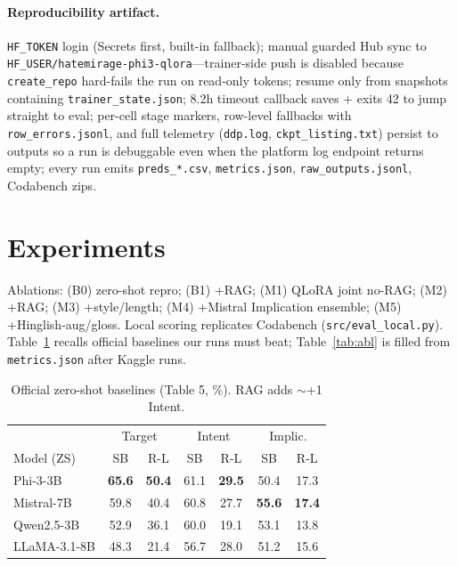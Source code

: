 \documentclass[11pt]{article}
\begin{document}
\paragraph{Reproducibility artifact.}
\texttt{HF\_TOKEN} login (Secrets first, built-in fallback); manual guarded Hub sync to \texttt{HF\_USER/hatemirage-phi3-qlora}---trainer-side push is disabled because \texttt{create\_repo} hard-fails the run on read-only tokens; resume only from snapshots containing \texttt{trainer\_state.json}; 8.2h timeout callback saves + exits 42 to jump straight to eval; per-cell stage markers, row-level fallbacks with \texttt{row\_errors.jsonl}, and full telemetry (\texttt{ddp.log}, \texttt{ckpt\_listing.txt}) persist to outputs so a run is debuggable even when the platform log endpoint returns empty; every run emits \texttt{preds\_*.csv}, \texttt{metrics.json}, \texttt{raw\_outputs.jsonl}, Codabench zips.

\section{Experiments}
Ablations: (B0) zero-shot repro; (B1) +RAG; (M1) QLoRA joint no-RAG; (M2) +RAG; (M3) +style/length; (M4) +Mistral Implication ensemble; (M5) +Hinglish-aug/gloss.
Local scoring replicates Codabench (\texttt{src/eval\_local.py}).
Table~\ref{tab:base} recalls official baselines our runs must beat; Table~\ref{tab:abl} is filled from \texttt{metrics.json} after Kaggle runs.

\begin{table}[t]
\centering
\small
\begin{tabular}{lcccccc}
\toprule
 & \multicolumn{2}{c}{Target} & \multicolumn{2}{c}{Intent} & \multicolumn{2}{c}{Implic.} \\
Model (ZS) & SB & R-L & SB & R-L & SB & R-L \\
\midrule
Phi-3-3B & \textbf{65.6} & \textbf{50.4} & 61.1 & \textbf{29.5} & 50.4 & 17.3 \\
Mistral-7B & 59.8 & 40.4 & 60.8 & 27.7 & \textbf{55.6} & \textbf{17.4} \\
Qwen2.5-3B & 52.9 & 36.1 & 60.0 & 19.1 & 53.1 & 13.8 \\
LLaMA-3.1-8B & 48.3 & 21.4 & 56.7 & 28.0 & 51.2 & 15.6 \\
\bottomrule
\end{tabular}
\caption{Official zero-shot baselines \cite{kasu2026hatemirage} (Table 5, \%). RAG adds $\sim$+1 Intent.}
\label{tab:base}
\end{table}
\end{document}

